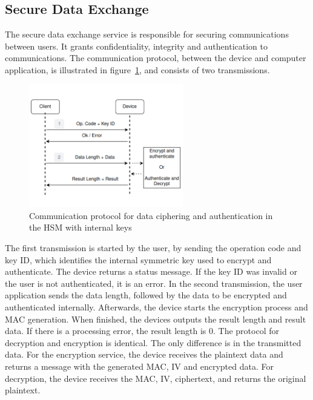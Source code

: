 \subsection{Secure Data Exchange}\label{chap:arch:services:data-exchange}

The secure data exchange service is responsible for securing communications between users. It grants confidentiality, integrity and authentication to communications.
The communication protocol, between the device and computer application, is illustrated in figure~\ref{fig:protocol:data-exchange}, and consists of two transmissions.
\begin{figure}[h!]
	\centering
	\includegraphics[width=0.60\textwidth]{./Images/data-exchange.png}
	\caption{Communication protocol for data ciphering and authentication in the HSM with internal keys}
	\label{fig:protocol:data-exchange}
\end{figure}

The first transmission is started by the user, by sending the operation code and key ID, which identifies the internal symmetric key used to encrypt and authenticate.
The device returns a status message. If the key ID was invalid or the user is not authenticated, it is an error.
In the second transmission, the user application sends the data length, followed by the data to be encrypted and authenticated internally.
Afterwards, the device starts the encryption process and \ac{MAC} generation. When finished, the devices outputs the result length and result data. If there is a processing error, the result length is 0.
The protocol for decryption and encryption is identical. The only difference is in the transmitted data. For the encryption service, the device receives the plaintext data and returns a message with the generated \ac{MAC}, \ac{IV} and encrypted data. For decryption, the device receives the \ac{MAC}, \ac{IV}, ciphertext, and returns the original plaintext.

